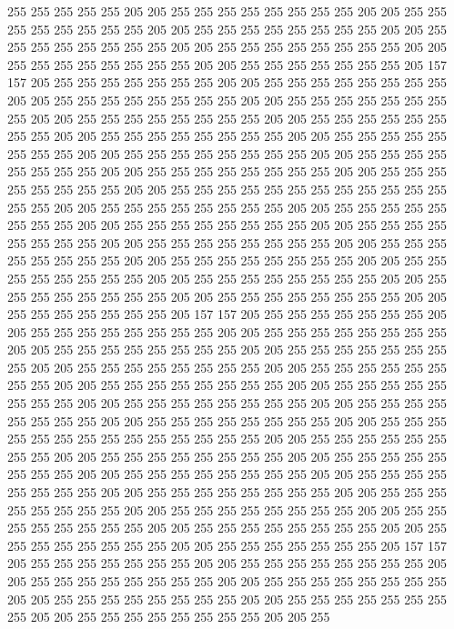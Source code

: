 255 255 255 255 255 205 205 255 255 255 255 255 255 255 255 205 205 255 255 255
255 255 255 255 255 205 205 255 255 255 255 255 255 255 255 205 205 255 255 255
255 255 255 255 255 205 205 255 255 255 255 255 255 255 255 205 205 255 255 255
255 255 255 255 255 205 205 255 255 255 255 255 255 255 205 157 157 205 255 255
255 255 255 255 255 205 205 255 255 255 255 255 255 255 255 205 205 255 255 255
255 255 255 255 255 205 205 255 255 255 255 255 255 255 255 205 205 255 255 255
255 255 255 255 255 205 205 255 255 255 255 255 255 255 255 205 205 255 255 255
255 255 255 255 255 205 205 255 255 255 255 255 255 255 255 205 205 255 255 255
255 255 255 255 255 205 205 255 255 255 255 255 255 255 255 205 205 255 255 255
255 255 255 255 255 205 205 255 255 255 255 255 255 255 255 205 205 255 255 255
255 255 255 255 255 255 255 255 255 255 255 205 205 255 255 255 255 255 255 255
255 205 205 255 255 255 255 255 255 255 255 205 205 255 255 255 255 255 255 255
255 205 205 255 255 255 255 255 255 255 255 205 205 255 255 255 255 255 255 255
255 205 205 255 255 255 255 255 255 255 255 205 205 255 255 255 255 255 255 255
255 205 205 255 255 255 255 255 255 255 255 205 205 255 255 255 255 255 255 255
255 205 205 255 255 255 255 255 255 255 255 205 205 255 255 255 255 255 255 255
255 205 205 255 255 255 255 255 255 255 205 157 157 205 255 255 255 255 255 255
255 205 205 255 255 255 255 255 255 255 255 205 205 255 255 255 255 255 255 255
255 205 205 255 255 255 255 255 255 255 255 205 205 255 255 255 255 255 255 255
255 205 205 255 255 255 255 255 255 255 255 205 205 255 255 255 255 255 255 255
255 205 205 255 255 255 255 255 255 255 255 205 205 255 255 255 255 255 255 255
255 205 205 255 255 255 255 255 255 255 255 205 205 255 255 255 255 255 255 255
255 205 205 255 255 255 255 255 255 255 255 205 205 255 255 255 255 255 255 255
255 255 255 255 255 255 255 205 205 255 255 255 255 255 255 255 255 205 205 255
255 255 255 255 255 255 255 205 205 255 255 255 255 255 255 255 255 205 205 255
255 255 255 255 255 255 255 205 205 255 255 255 255 255 255 255 255 205 205 255
255 255 255 255 255 255 255 205 205 255 255 255 255 255 255 255 255 205 205 255
255 255 255 255 255 255 255 205 205 255 255 255 255 255 255 255 255 205 205 255
255 255 255 255 255 255 255 205 205 255 255 255 255 255 255 255 255 205 205 255
255 255 255 255 255 255 205 157 157 205 255 255 255 255 255 255 255 205 205 255
255 255 255 255 255 255 255 205 205 255 255 255 255 255 255 255 255 205 205 255
255 255 255 255 255 255 255 205 205 255 255 255 255 255 255 255 255 205 205 255
255 255 255 255 255 255 255 205 205 255 255 255 255 255 255 255 255 205 205 255
